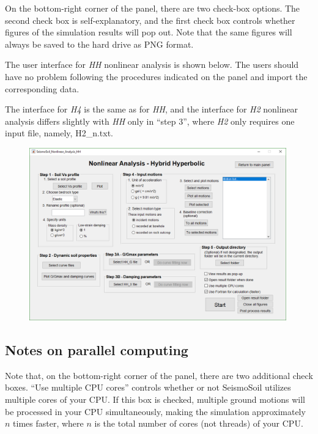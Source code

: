 \documentclass[11pt,letterpaper]{article}
\begin{document}
On the bottom-right corner of the panel, there are two check-box options. The second check box is self-explanatory, and the first check box controls whether figures of the simulation results will pop out. Note that the same figures will always be saved to the hard drive as PNG format.

\newpage
The user interface for \emph{HH} nonlinear analysis is shown below. The users should have no problem following the procedures indicated on the panel and import the corresponding data. 

The interface for \emph{H4} is the same as for \emph{HH}, and the interface for \emph{H2} nonlinear analysis differs slightly with \emph{HH} only in ``step 3'', where \emph{H2} only requires one input file, namely, \textsf{H2\_n.txt}.

\begin{figure}[H]
\centering
  \includegraphics[width=0.99\textwidth]{HH_panel.png}\\
\end{figure}

\subsection{Notes on parallel computing}

Note that, on the bottom-right corner of the panel, there are two additional check boxes. ``Use multiple CPU cores'' controls whether or not SeismoSoil utilizes multiple cores of your CPU. If this box is checked, multiple ground motions will be processed in your CPU simultaneously, making the simulation approximately $n$ times faster, where $n$ is the total number of cores (not threads) of your CPU.
\end{document}
